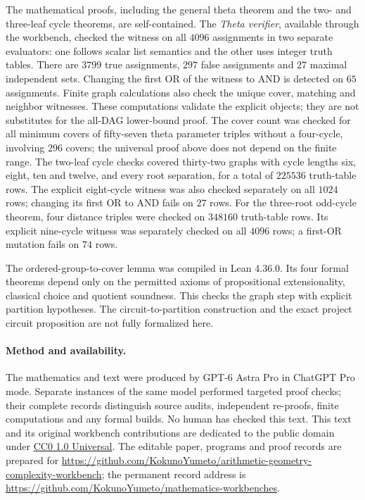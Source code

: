 \documentclass[11pt]{article}
\newcommand{\workbenchurl}{https://github.com/KokunoYumeto/arithmetic-geometry-complexity-workbench}
\newcommand{\recordurl}{https://github.com/KokunoYumeto/mathematics-workbenches}
\theoremstyle{definition}
\theoremstyle{remark}
\begin{document}
The mathematical proofs, including the general theta theorem and the
two- and three-leaf cycle theorems, are self-contained.
The \emph{Theta verifier}, available through the workbench\cite{workbench},
checked the witness on all $4096$ assignments in two separate evaluators:
one follows scalar list semantics and the other uses integer truth tables.
There are $3799$ true assignments, $297$ false assignments and $27$ maximal
independent sets. Changing the first OR of the witness to AND is detected
on $65$ assignments. Finite graph calculations also check the unique cover,
matching and neighbor witnesses. These computations validate the explicit
objects; they are not substitutes for the all-DAG lower-bound proof.
The cover count was checked for all minimum covers of fifty-seven theta
parameter triples without a four-cycle, involving $296$ covers; the
universal proof above does not depend on the finite range.
The two-leaf cycle checks covered thirty-two graphs with cycle lengths
six, eight, ten and twelve, and every root separation, for a total of
$225536$ truth-table rows. The explicit eight-cycle witness was also
checked separately on all $1024$ rows; changing its first OR to AND
fails on $27$ rows. For the three-root odd-cycle theorem, four distance
triples were checked on $348160$ truth-table rows. Its explicit nine-cycle
witness was separately checked on all $4096$ rows; a first-OR mutation
fails on $74$ rows.

The ordered-group-to-cover lemma was compiled in Lean 4.36.0. Its four
formal theorems depend only on the permitted axioms of propositional
extensionality, classical choice and quotient soundness. This checks the
graph step with explicit partition hypotheses. The circuit-to-partition
construction and the exact project circuit proposition are not fully
formalized here. 

\paragraph{Method and availability.}
The mathematics and text were produced by GPT-6 Astra Pro in ChatGPT Pro
mode. Separate instances of the same model performed targeted proof checks;
their complete records distinguish source audits, independent re-proofs,
finite computations and any formal builds. No human has checked this text. This text and its original workbench contributions
are dedicated to the public domain under
\href{https://creativecommons.org/publicdomain/zero/1.0/}{CC0 1.0 Universal}.
The editable paper, programs and proof records are prepared for
\url{\workbenchurl}; the permanent record address is
\url{\recordurl}.
\end{document}
